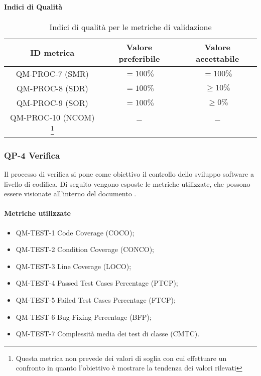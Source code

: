 		\paragraph{Indici di Qualità}

			\begin{center}
				\begin{longtable}{|c|c|c|}
				\hline
				\rowcolor{lighter-grayer}
				\textbf{ID metrica} & \textbf{Valore preferibile} & \textbf{Valore accettabile}\\
				\hline
				\endfirsthead
				\hline
				QM-PROC-7 (SMR) & \(= 100\%\) & \(= 100\%\) \\
				\hline
				QM-PROC-8 (SDR) & \(= 100\%\) & \(\geq 10\%\) \\
				\hline
				QM-PROC-9 (SOR) & \(= 100\%\) & \(\geq 0\%\) \\
				\hline
				QM-PROC-10 (NCOM) \footnote{Questa metrica non prevede dei valori di soglia con cui effettuare un confronto in quanto l'obiettivo è mostrare la tendenza dei valori rilevati} & \(-\) & \(-\) \\
				\hline
				\caption{Indici di qualità per le metriche di validazione}
				\end{longtable}
			\end{center}
	\newpage
	\subsubsection{QP-4 Verifica}

		Il processo di verifica si pone come obiettivo il controllo dello sviluppo software a livello di codifica.
		\newline
		Di seguito vengono esposte le metriche utilizzate, che possono essere visionate all'interno del documento .

		\paragraph{Metriche utilizzate}

			\begin{itemize}
				\item QM-TEST-1 Code Coverage (COCO);
				\item QM-TEST-2 Condition Coverage (CONCO);
				\item QM-TEST-3 Line Coverage (LOCO);
				\item QM-TEST-4 Passed Test Cases Percentage (PTCP);
				\item QM-TEST-5 Failed Test Cases Percentage (FTCP);
				\item QM-TEST-6 Bug-Fixing Percentage (BFP);
				\item QM-TEST-7 Complessità media dei test di classe (CMTC).
			\end{itemize}


